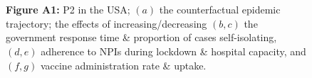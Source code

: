 \documentclass[paper=a4,fontsize=11pt]{article}
\begin{document}
\begin{figure}[!h]
  \hspace{1.8cm}
  \\
  \hspace{1.76cm}
  \\
  \caption*{\textbf{Figure A1:} P2 in the USA; $(a)$ the counterfactual epidemic trajectory; the effects of increasing/decreasing $(b,c)$ the government response time \& proportion of cases self-isolating, $(d,e)$ adherence to NPIs during lockdown \& hospital capacity, and $(f,g)$ vaccine administration rate \& uptake.}
\end{figure}
\end{document}

